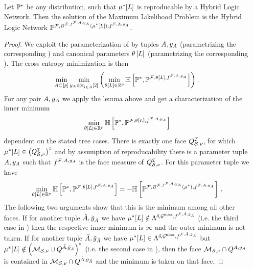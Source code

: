 \begin{theorem}
    Let $\mathbb{P}^*$ be any distribution, such that $\mu^*[L]$ is reproducable by a Hybrid Logic Network.
    Then the solution of the Maximum Likelihood Problem  is the Hybrid Logic Network $\mathbb{P}^{\mathcal{F},B^{\mathcal{F},f^{\mathcal{F},A,y_{A}}}(\mu^*[L]),f^{\mathcal{F},A,y_{A}}}$.
\end{theorem}
\begin{proof}
    We exploit the parameterization of \HybridLogicNetworks{} by tuples $A,y_{A}$ (parametrizing the corresponding \HardLogicNetwork{}) and canonical parameters $\theta\left[L\right]$ (parametrizing the corresponding \MarkovLogicNetwork{}).
    The cross entropy minimization is then
    \begin{align*}
        \min_{A\subset[p]}\min_{y_{A}\in\bigtimes_{l\in A}[2]} \left(\min_{\theta\left[L\right]\in\mathbb{R}^{p}} \mathbb{H}\left[\mathbb{P}^*,\mathbb{P}^{\mathcal{F},\theta\left[L\right],f^{\mathcal{F},A,y_{A}}}\right]\right) \, .
    \end{align*}
    For any pair $A,y_{A}$ we apply the lemma above and get a characterization of the inner minimum
    \begin{align*}
        \min_{\theta\left[L\right]\in\mathbb{R}^{p}} \mathbb{H}\left[\mathbb{P}^*,\mathbb{P}^{\mathcal{F},\theta\left[L\right],f^{\mathcal{F},A,y_{A}}}\right]
    \end{align*}
    dependent on the stated tree cases.
    There is exactly one face $Q^{\mathcal{I}}_{\mathcal{S},\nu}$, for which $\mu^*[L]\in{\left(Q^{\mathcal{I}}_{\mathcal{S},\nu}\right)}^{\circ}$ and by assumption of reproducability there is a parameter tuple $A,y_{A}$ such that $f^{\mathcal{F},A,y_{A}}$ is the face measure of $Q^{\mathcal{I}}_{\mathcal{S},\nu}$.
    For this parameter tuple we have
    \begin{align*}
        \min_{\theta\left[L\right]\in\mathbb{R}^{p}} \mathbb{H}\left[\mathbb{P}^*,\mathbb{P}^{\mathcal{F},\theta\left[L\right],f^{\mathcal{F},A,y_{A}}}\right]
        = -\mathbb{H}\left[\mathbb{P}^{\mathcal{F},B^{\mathcal{F},f^{\mathcal{F},A,y_{A}}}(\mu^*),f^{\mathcal{F},A,y_{A}}}\right] \, .
    \end{align*}
    The following two arguments show that this is the minimum among all other faces.
    If for another tuple $\tilde{A},\tilde{y}_{\tilde{A}}$ we have $\mu^*[L]\notin\Lambda^{\delta,\mathcal{G}^{\mathrm{max}},f^{\mathcal{F},\tilde{A},\tilde{y}_{\tilde{A}}}}$ (i.e. the third case in ) then the respective inner minimum is $\infty$ and the outer minimum is not taken.
    If for another tuple $\tilde{A},\tilde{y}_{\tilde{A}}$ we have $\mu^*[L]\in\Lambda^{\delta,\mathcal{G}^{\mathrm{max}},f^{\mathcal{F},\tilde{A},\tilde{y}_{\tilde{A}}}}$ but $\mu^*[L]\notin{\left(\mathcal{M}_{\mathcal{S},\nu}\cup Q^{\tilde{A},\tilde{y}_{\tilde{A}}}\right)}^{\circ}$ (i.e. the second case in ), then the face $\mathcal{M}_{\mathcal{S},\nu}\cap Q^{A,y_{A}}$ is contained in $\mathcal{M}_{\mathcal{S},\nu}\cap Q^{\tilde{A},\tilde{y}_{\tilde{A}}}$ and the minimum is taken on that face.
\end{proof}


